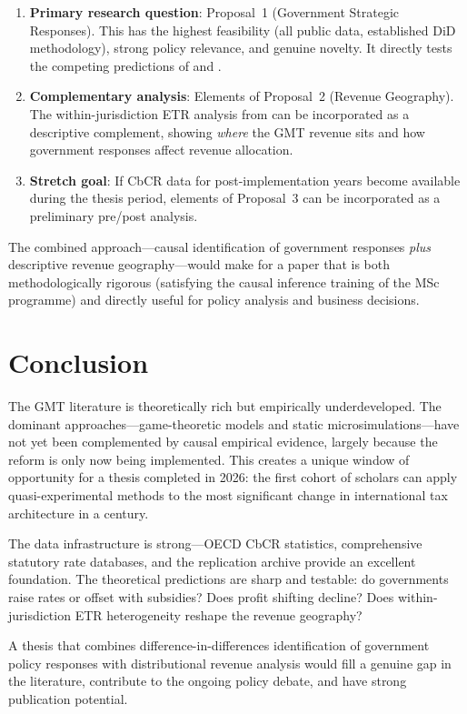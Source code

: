 \documentclass[11pt,a4paper]{article}
\begin{document}
\begin{enumerate}
    \item \textbf{Primary research question}: Proposal~1 (Government Strategic Responses). This has the highest feasibility (all public data, established DiD methodology), strong policy relevance, and genuine novelty. It directly tests the competing predictions of \citet{hebous2023} and \citet{janeba2023}.
    
    \item \textbf{Complementary analysis}: Elements of Proposal~2 (Revenue Geography). The within-jurisdiction ETR analysis from \citet{hugger2025} can be incorporated as a descriptive complement, showing \emph{where} the GMT revenue sits and how government responses affect revenue allocation.
    
    \item \textbf{Stretch goal}: If CbCR data for post-implementation years become available during the thesis period, elements of Proposal~3 can be incorporated as a preliminary pre/post analysis.
\end{enumerate}

The combined approach---causal identification of government responses \emph{plus} descriptive revenue geography---would make for a paper that is both methodologically rigorous (satisfying the causal inference training of the MSc programme) and directly useful for policy analysis and business decisions.


\section{Conclusion}
\label{sec:conclusion}


The GMT literature is theoretically rich but empirically underdeveloped. The dominant approaches---game-theoretic models and static microsimulations---have not yet been complemented by causal empirical evidence, largely because the reform is only now being implemented. This creates a unique window of opportunity for a thesis completed in 2026: the first cohort of scholars can apply quasi-experimental methods to the most significant change in international tax architecture in a century.

The data infrastructure is strong---OECD CbCR statistics, comprehensive statutory rate databases, and the \citet{torslov2022} replication archive provide an excellent foundation. The theoretical predictions are sharp and testable: do governments raise rates or offset with subsidies? Does profit shifting decline? Does within-jurisdiction ETR heterogeneity reshape the revenue geography?

A thesis that combines difference-in-differences identification of government policy responses with distributional revenue analysis would fill a genuine gap in the literature, contribute to the ongoing policy debate, and have strong publication potential.


\printbibliography
\end{document}
